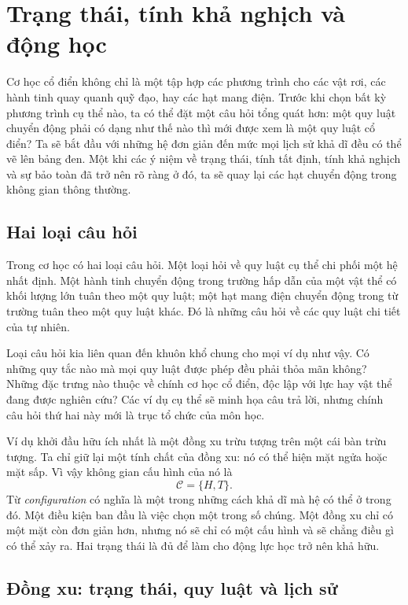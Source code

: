 \chapter{Trạng thái, tính khả nghịch và động học}

Cơ học cổ điển không chỉ là một tập hợp các phương trình cho các vật rơi, các hành tinh quay quanh quỹ đạo, hay các hạt mang điện. Trước khi chọn bất kỳ phương trình cụ thể nào, ta có thể đặt một câu hỏi tổng quát hơn: một quy luật chuyển động phải có dạng như thế nào thì mới được xem là một quy luật cổ điển? Ta sẽ bắt đầu với những hệ đơn giản đến mức mọi lịch sử khả dĩ đều có thể vẽ lên bảng đen. Một khi các ý niệm về trạng thái, tính tất định, tính khả nghịch và sự bảo toàn đã trở nên rõ ràng ở đó, ta sẽ quay lại các hạt chuyển động trong không gian thông thường.

\section{Hai loại câu hỏi}

Trong cơ học có hai loại câu hỏi. Một loại hỏi về quy luật cụ thể chi phối một hệ nhất định. Một hành tinh chuyển động trong trường hấp dẫn của một vật thể có khối lượng lớn tuân theo một quy luật; một hạt mang điện chuyển động trong từ trường tuân theo một quy luật khác. Đó là những câu hỏi về các quy luật chi tiết của tự nhiên.

Loại câu hỏi kia liên quan đến khuôn khổ chung cho mọi ví dụ như vậy. Có những quy tắc nào mà mọi quy luật được phép đều phải thỏa mãn không? Những đặc trưng nào thuộc về chính cơ học cổ điển, độc lập với lực hay vật thể đang được nghiên cứu? Các ví dụ cụ thể sẽ minh họa câu trả lời, nhưng chính câu hỏi thứ hai này mới là trục tổ chức của môn học.

Ví dụ khởi đầu hữu ích nhất là một đồng xu trừu tượng trên một cái bàn trừu tượng. Ta chỉ giữ lại một tính chất của đồng xu: nó có thể hiện mặt ngửa hoặc mặt sấp. Vì vậy không gian cấu hình của nó là
\begin{equation}
  \mathcal C=\{H,T\}.
\end{equation}
Từ \emph{configuration} có nghĩa là một trong những cách khả dĩ mà hệ có thể ở trong đó. Một điều kiện ban đầu là việc chọn một trong số chúng. Một đồng xu chỉ có một mặt còn đơn giản hơn, nhưng nó sẽ chỉ có một cấu hình và sẽ chẳng điều gì có thể xảy ra. Hai trạng thái là đủ để làm cho động lực học trở nên khả hữu.

\section{Đồng xu: trạng thái, quy luật và lịch sử}

